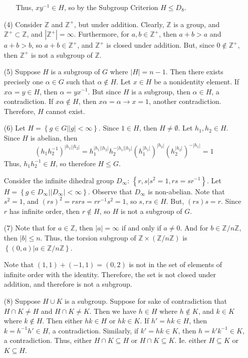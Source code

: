 \documentclass[12pt]{article}
\begin{document}
\begin{itemize}
\begin{itemize}
Thus, $xy^{-1} \in H$, so by the Subgroup Criterion $H \leq D_8$.
\end{itemize}
\item[(4)]
Consider $\mathbb{Z}$ and $\mathbb{Z}^+$, but under addition. Clearly, $\mathbb{Z}$ is a group, and $\mathbb{Z}^+ \subset \mathbb{Z}$, and $|\mathbb{Z}^+| = \infty$. Furthermore, for $a, b \in \mathbb{Z}^+$, then $a + b > a$ and $a + b > b$, so $a + b \in \mathbb{Z}^+$, and $\mathbb{Z}^+$ is closed under addition. But, since $0 \not \in \mathbb{Z}^+$, then $\mathbb{Z}^+$ is not a subgroup of $\mathbb{Z}$.
\item[(5)]
Suppose $H$ is a subgroup of $G$ where $|H| = n - 1$. Then there exists precisely one $\alpha \in G$ such that $\alpha \not \in H$. Let $x \in H$ be a nonidentity element. If $x\alpha = y \in H$, then $\alpha = yx^{-1}$. But since $H$ is a subgroup, then $\alpha \in H$, a contradiction. If $x\alpha \not \in H$, then $x\alpha = \alpha \rightarrow x = 1$, another contradiction. Therefore, $H$ cannot exist.
\item[(6)]
Let $H = \left\lbrace g \in G | |g| < \infty \right\rbrace$. Since $1 \in H$, then $H \neq \emptyset$. Let $h_1, h_2 \in H$. Since $H$ is abelian, then
$$(h_1h_2^{-1})^{|h_1||h_2|} = h_1^{|h_1||h_2|}h_2^{-|h_1||h_2|} (h_1^{|h_1|})^{|h_2|}(h_2^{|h_2|})^{-|h_1|} = 1$$
Thus, $h_1h_2^{-1} \in H$, so therefore $H \leq G$.

Consider the infinite dihedral group $D_\infty$: $\left\lbrace r, s | s^2 = 1, rs = sr^{-1} \right\rbrace$. Let $H = \left\lbrace g \in D_\infty | |D_\infty| < \infty \right\rbrace$. Observe that $D_\infty$ is non-abelian. Note that $s^2 = 1$, and $(rs)^2 = rsrs = rr^{-1}s^2 = 1$, so $s, rs \in H$. But, $(rs)s = r$. Since $r$ has infinite order, then $r \not \in H$, so $H$ is not a subgroup of $G$.
\item[(7)]
Note that for $a \in \mathbb{Z}$, then $|a| = \infty$ if and only if $a \neq 0$. And for $b \in \mathbb{Z}/n\mathbb{Z}$, then $|b| \leq n$. Thus, the torsion subgroup of $\mathbb{Z} \times (\mathbb{Z}/n\mathbb{Z})$ is $\left\lbrace (0, a) | a \in \mathbb{Z}/n\mathbb{Z} \right\rbrace$.

Note that $(1, 1) + (-1, 1) = (0, 2)$ is not in the set of elements of infinite order with the identity. Therefore, the set is not closed under addition, and therefore is not a subgroup.
\item[(8)]
Suppose $H \cup K$ is a subgroup. Suppose for sake of contradiction that $H \cap K \neq H$ and $H \cap K \neq K$. Then we have $h \in H$ where $h \not \in K$, and $k \in K$ where $k \not \in H$. Then either $hk \in H$ or $hk \in K$. If $h' = hk \in H$, then $k = h^{-1}h' \in H$, a contradiction. Similarly, if $k' = hk \in K$, then $h = k'k^{-1} \in K$, a contradiction. Thus, either $H \cap K \subseteq H$ or $H \cap K \subseteq K$. Ie. either $H \subseteq K$ or $K \subseteq H$.


\end{itemize}
\end{document}
